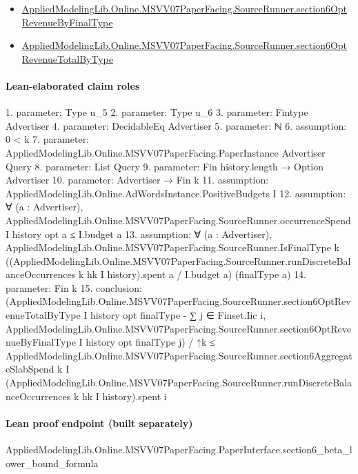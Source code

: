 \documentclass[10pt]{article}
\begin{document}
\begin{itemize}
\item \hyperlink{paper-prerequisite-12b6373cc5d91f04}{Applied\allowbreak{}Modeling\allowbreak{}Lib.\allowbreak{}Online.\allowbreak{}MSVV07\allowbreak{}Paper\allowbreak{}Facing.\allowbreak{}Source\allowbreak{}Runner.\allowbreak{}section6\allowbreak{}Opt\allowbreak{}Revenue\allowbreak{}By\allowbreak{}Final\allowbreak{}Type}
\item \hyperlink{governing-declaration-47d6db1865bbbcd6}{Applied\allowbreak{}Modeling\allowbreak{}Lib.\allowbreak{}Online.\allowbreak{}MSVV07\allowbreak{}Paper\allowbreak{}Facing.\allowbreak{}Source\allowbreak{}Runner.\allowbreak{}section6\allowbreak{}Opt\allowbreak{}Revenue\allowbreak{}Total\allowbreak{}By\allowbreak{}Type}
\end{itemize}
\paragraph{Lean-elaborated claim roles}\begin{ReviewVerbatim}
1. parameter: Type u_5
2. parameter: Type u_6
3. parameter: Fintype Advertiser
4. parameter: DecidableEq Advertiser
5. parameter: ℕ
6. assumption: 0 < k
7. parameter: AppliedModelingLib.Online.MSVV07PaperFacing.PaperInstance Advertiser Query
8. parameter: List Query
9. parameter: Fin history.length → Option Advertiser
10. parameter: Advertiser → Fin k
11. assumption: AppliedModelingLib.Online.AdWordsInstance.PositiveBudgets I
12. assumption: ∀ (a : Advertiser),
  AppliedModelingLib.Online.MSVV07PaperFacing.SourceRunner.occurrenceSpend I history opt a ≤ I.budget a
13. assumption: ∀ (a : Advertiser),
  AppliedModelingLib.Online.MSVV07PaperFacing.SourceRunner.IsFinalType k
    ((AppliedModelingLib.Online.MSVV07PaperFacing.SourceRunner.runDiscreteBalanceOccurrences k hk I history).spent a /
      I.budget a)
    (finalType a)
14. parameter: Fin k
15. conclusion: (AppliedModelingLib.Online.MSVV07PaperFacing.SourceRunner.section6OptRevenueTotalByType I history opt finalType -
      ∑ j ∈ Finset.Iic i,
        AppliedModelingLib.Online.MSVV07PaperFacing.SourceRunner.section6OptRevenueByFinalType I history opt finalType
          j) /
    ↑k ≤
  AppliedModelingLib.Online.MSVV07PaperFacing.SourceRunner.section6AggregateSlabSpend k I
    (AppliedModelingLib.Online.MSVV07PaperFacing.SourceRunner.runDiscreteBalanceOccurrences k hk I history).spent i
\end{ReviewVerbatim}

\paragraph{Lean proof endpoint (built separately)}\begin{ReviewVerbatim}
AppliedModelingLib.Online.MSVV07PaperFacing.PaperInterface.section6_beta_lower_bound_formula
\end{ReviewVerbatim}
\end{document}
